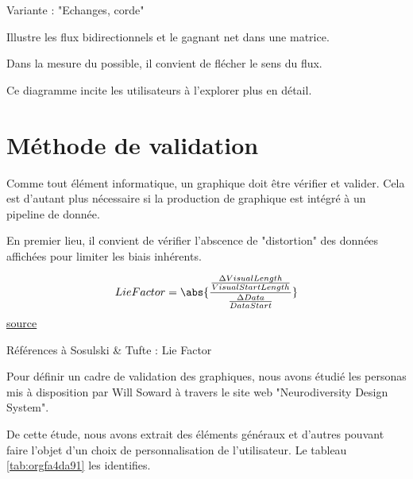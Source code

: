 \documentclass[a4paper,12pt]{article}
\begin{document}
\begin{multicols}{2}
Variante : "Echanges, corde"

Illustre les flux bidirectionnels et le gagnant net dans une matrice. \autocite{alansmithLexiqueVisuel}

Dans la mesure du possible, il convient de flécher le sens du flux.

Ce diagramme incite les utilisateurs à l'explorer plus en détail. \autocite{jonathanschwabishRelationship2021}
\section*{Méthode de validation}
\label{sec:org7ada156}
Comme tout élément informatique, un graphique doit être vérifier et valider. Cela est d'autant plus nécessaire si la production de graphique est intégré à un pipeline de donnée.

En premier lieu, il convient de vérifier l'abscence de "distortion" des données affichées pour limiter les biais inhérents.\autocite{stephenfewGeneralGraphDesign2012}

$$LieFactor=\abs{\frac{\frac{\Delta VisualLength}{VisualStartLength}}{\frac{\Delta Data}{DataStart}}}$$
\href{https://www.labo.mathieurella.fr/?p=395}{source}

Références à Sosulski \& Tufte : Lie Factor

Pour définir un cadre de validation des graphiques, nous avons étudié les personas mis à disposition par Will Soward à travers le site web "Neurodiversity Design System".\autocite{NeurodiversityDesignSystem}

De cette étude, nous avons extrait des éléments généraux et d'autres pouvant faire l'objet d'un choix de personnalisation de l'utilisateur. Le tableau \ref{tab:orgfa4da91} les identifies.


\end{multicols}
\end{document}
